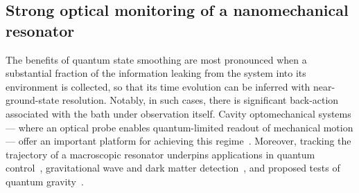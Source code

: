 \documentclass[aps,prx,twocolumn,amsmath,amssymb,superscriptaddress,floatfix,longbibliography
]{revtex4-2}
\begin{document}
\subsection*{Strong optical monitoring of a  nanomechanical resonator}

The benefits of quantum state smoothing are most pronounced when a substantial fraction of the information leaking from the system into its environment is collected, so that its time evolution can be inferred with near-ground-state resolution.
Notably, in such cases, there is significant back-action associated with the bath under observation itself. 
Cavity optomechanical systems --- where an optical probe enables quantum-limited readout of mechanical motion --- offer an important platform for achieving this regime~\cite{aspelmeyer2014cavity,mason2019continuous,rossi2019observing,bowen2015quantum}. Moreover, tracking the trajectory of a macroscopic resonator underpins applications in quantum control~\cite{guo2019feedback}, gravitational wave and dark matter detection~\cite{muller2008entanglement,hirschel2024superfluid,baker2024optomechanical}, and proposed tests of quantum gravity~\cite{girdhar2020testing}. 
\end{document}

